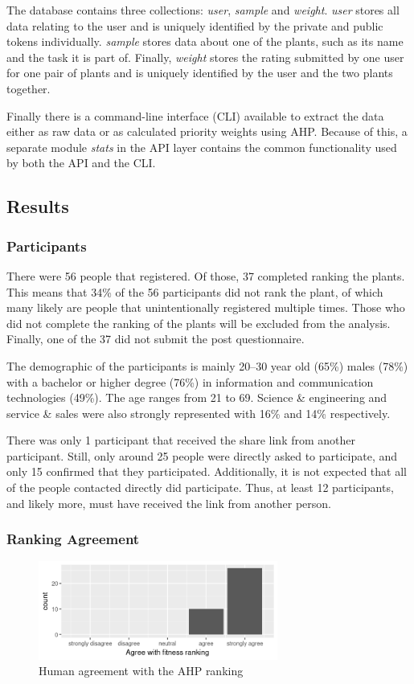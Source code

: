 The database contains three collections: \textit{user}, \textit{sample} and \textit{weight}.
\textit{user} stores all data relating to the user and is uniquely identified by the private and public tokens individually.
\textit{sample} stores data about one of the plants, such as its name and the task it is part of.
Finally, \textit{weight} stores the rating submitted by one user for one pair of plants and is uniquely identified by the user and the two plants together.

Finally there is a command-line interface (CLI) available to extract the data either as raw data or as calculated priority weights using AHP.
Because of this, a separate module \textit{stats} in the API layer contains the common functionality used by both the API and the CLI.

\subsection{Results}
\subsubsection{Participants}
There were 56 people that registered.
Of those, 37 completed ranking the plants.
This means that 34\% of the 56 participants did not rank the plant, of which many likely are people that unintentionally registered multiple times.
Those who did not complete the ranking of the plants will be excluded from the analysis.
Finally, one of the 37 did not submit the post questionnaire.

The demographic of the participants is mainly 20--30 year old (65\%) males (78\%) with a bachelor or higher degree (76\%) in information and communication technologies (49\%).
The age ranges from 21 to 69.
Science \& engineering and service \& sales were also strongly represented with 16\% and 14\% respectively.

There was only 1 participant that received the share link from another participant.
Still, only around 25 people were directly asked to participate, and only 15 confirmed that they participated.
Additionally, it is not expected that all of the people contacted directly did participate.
Thus, at least 12 participants, and likely more, must have received the link from another person.


\subsubsection{Ranking Agreement}
\begin{figure}
    \centering
    \includegraphics[width=0.7\textwidth]{figures/agree}
    \caption{Human agreement with the AHP ranking}
    \label{fig:agree}
\end{figure}

